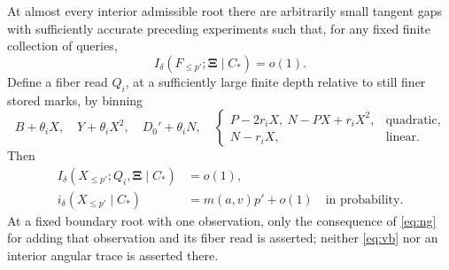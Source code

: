 \begin{proposition}
\label{names:replica-budgets}
At almost every interior admissible root there are arbitrarily
small tangent gaps with sufficiently accurate preceding
experiments such that, for any fixed finite collection of
queries,
\begin{equation}
 I_\delta(F_{\leq p'};\boldsymbol\Xi\mid C_*)=o(1).
 \tag{vb}\label{eq:vb}
\end{equation}
Define a fiber read \(Q_i\), at a sufficiently large finite
depth relative to still finer stored marks, by binning
\[
 B+\theta_iX,\quad Y+\theta_iX^2,\quad D_0'+\theta_iN,
 \quad
 \begin{cases}
 P-2r_iX,\ N-PX+r_iX^2,&\text{quadratic},\\
 N-r_iX,&\text{linear}.
 \end{cases}
\]
Then
\begin{equation}
 \begin{split}
 I_\delta(X_{\leq p'};Q_i,\boldsymbol\Xi\mid C_*)&=o(1),\\
 i_\delta(X_{\leq p'}\mid C_*)&=m(a,v)p'+o(1)
                         \quad\text{in probability}.
 \end{split}
 \tag{fib}\label{eq:fib}
\end{equation}
At a fixed boundary root with one observation, only the
consequence of \eqref{eq:ng} for adding that observation and
its fiber read is asserted; neither \eqref{eq:vb} nor an
interior angular trace is asserted there.
\end{proposition}

